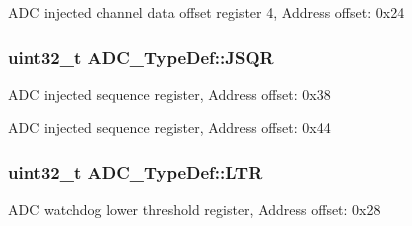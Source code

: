 A\-D\-C injected channel data offset register 4, Address offset\-: 0x24 \hypertarget{struct_a_d_c___type_def_a5438a76a93ac1bd2526e92ef298dc193}{
\subsubsection[{J\-S\-Q\-R}]{ uint32\-\_\-t A\-D\-C\-\_\-\-Type\-Def\-::\-J\-S\-Q\-R}}\label{struct_a_d_c___type_def_a5438a76a93ac1bd2526e92ef298dc193}
A\-D\-C injected sequence register, Address offset\-: 0x38

A\-D\-C injected sequence register, Address offset\-: 0x44 \hypertarget{struct_a_d_c___type_def_afdaf8050fb01739206a92c9ad610f396}{
\subsubsection[{L\-T\-R}]{ uint32\-\_\-t A\-D\-C\-\_\-\-Type\-Def\-::\-L\-T\-R}}\label{struct_a_d_c___type_def_afdaf8050fb01739206a92c9ad610f396}
A\-D\-C watchdog lower threshold register, Address offset\-: 0x28


